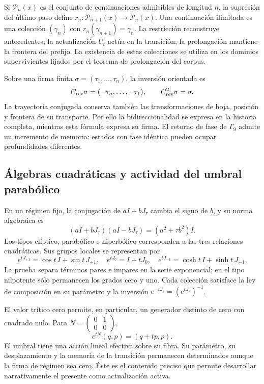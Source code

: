 Si \(\mathcal P_n(x)\) es el conjunto de continuaciones admisibles de
longitud \(n\), la supresión del último paso define
\(r_n:\mathcal P_{n+1}(x)\to\mathcal P_n(x)\). Una continuación
ilimitada es una colección \((\gamma_n)\) con
\(r_n(\gamma_{n+1})=\gamma_n\). La restricción reconstruye antecedentes;
la actualización \(U_t\) actúa en la transición; la prolongación mantiene
la frontera del prefijo. La existencia de estas colecciones se utiliza en
los dominios supervivientes fijados por el teorema de prolongación del
corpus.

Sobre una firma finita \(\sigma=(\tau_1,\ldots,\tau_n)\), la inversión
orientada es
\[
 C_{\rm rev}\sigma=(-\tau_n,\ldots,-\tau_1),
 \qquad C_{\rm rev}^2\sigma=\sigma.
\]
La trayectoria conjugada conserva también las transformaciones de hoja,
posición y frontera de su transporte. Por ello la bidireccionalidad se
expresa en la historia completa, mientras esta fórmula expresa su firma.
El retorno de fase de \(\Gamma_9\) admite un incremento de memoria:
estados con fase idéntica pueden ocupar profundidades diferentes.

\subsection{Álgebras cuadráticas y actividad del umbral parabólico}

En un régimen fijo, la conjugación de \(aI+bJ_\tau\) cambia el signo
de \(b\), y su norma algebraica es
\[
 (aI+bJ_\tau)(aI-bJ_\tau)=(a^2+\tau b^2)I.
\]
Los tipos elíptico, parabólico e hiperbólico corresponden a las tres
relaciones cuadráticas. Sus grupos locales se representan por
\[
 e^{tJ_{+1}}=\cos t\,I+\sin t\,J_{+1},\quad
 e^{tJ_0}=I+tJ_0,\quad
 e^{tJ_{-1}}=\cosh t\,I+\sinh t\,J_{-1}.
\]
La prueba separa términos pares e impares en la serie exponencial; en el
tipo nilpotente sólo permanecen los grados cero y uno. Cada colección
satisface la ley de composición en su parámetro y la inversión
\(e^{-tJ_\tau}=(e^{tJ_\tau})^{-1}\).

El valor trítico cero permite, en particular, un generador distinto de
cero con cuadrado nulo. Para
\(N=\left(\begin{smallmatrix}0&1\\0&0\end{smallmatrix}\right)\),
\[
 e^{tN}(q,p)=(q+tp,p).
\]
El umbral tiene una acción lineal efectiva sobre su fibra. Su parámetro,
su desplazamiento y la memoria de la transición permanecen determinados
aunque la firma de régimen sea cero. Éste es el contenido preciso que
permite desarrollar narrativamente el presente como actualización activa.

